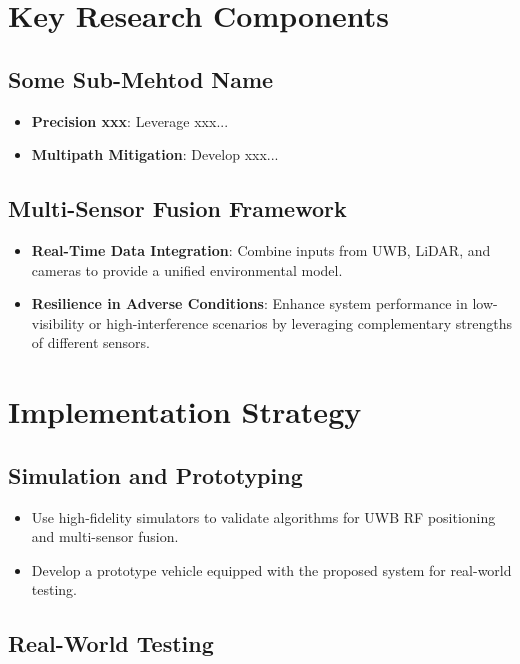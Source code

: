 \documentclass[conference, 12pt]{IEEEtran}
\begin{document}
\section{Key Research Components}

\subsection{Some Sub-Mehtod Name}

\begin{itemize}
\item \textbf{Precision xxx}: Leverage xxx...
\item \textbf{Multipath Mitigation}: Develop xxx...
\end{itemize}

\subsection{Multi-Sensor Fusion Framework}

\begin{itemize}
\item \textbf{Real-Time Data Integration}: Combine inputs from UWB, LiDAR, and cameras to provide a unified environmental model.
\item \textbf{Resilience in Adverse Conditions}: Enhance system performance in low-visibility or high-interference scenarios by leveraging complementary strengths of different sensors.
\end{itemize}

\section{Implementation Strategy}

\subsection{Simulation and Prototyping}

\begin{itemize}
\item Use high-fidelity simulators to validate algorithms for UWB RF positioning and multi-sensor fusion.
\item Develop a prototype vehicle equipped with the proposed system for real-world testing.
\end{itemize}

\subsection{Real-World Testing}
\end{document}
